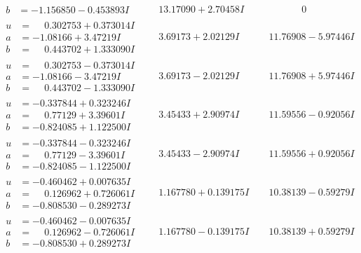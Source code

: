 \documentclass[1p]{elsarticle_modified}
\theoremstyle{definition}
\begin{document}
$$\begin{array}{c|c|c}
\begin{aligned}
b &= -1.156850 - 0.453893 I\end{aligned}
 & \phantom{-}13.17090 + 2.70458 I & \phantom{-0.000000 } 0 \\ \hline\begin{aligned}
u &= \phantom{-}0.302753 + 0.373014 I \\
a &= -1.08166 + 3.47219 I \\
b &= \phantom{-}0.443702 + 1.333090 I\end{aligned}
 & \phantom{-}3.69173 + 2.02129 I & \phantom{-}11.76908 - 5.97446 I \\ \hline\begin{aligned}
u &= \phantom{-}0.302753 - 0.373014 I \\
a &= -1.08166 - 3.47219 I \\
b &= \phantom{-}0.443702 - 1.333090 I\end{aligned}
 & \phantom{-}3.69173 - 2.02129 I & \phantom{-}11.76908 + 5.97446 I \\ \hline\begin{aligned}
u &= -0.337844 + 0.323246 I \\
a &= \phantom{-}0.77129 + 3.39601 I \\
b &= -0.824085 + 1.122500 I\end{aligned}
 & \phantom{-}3.45433 + 2.90974 I & \phantom{-}11.59556 - 0.92056 I \\ \hline\begin{aligned}
u &= -0.337844 - 0.323246 I \\
a &= \phantom{-}0.77129 - 3.39601 I \\
b &= -0.824085 - 1.122500 I\end{aligned}
 & \phantom{-}3.45433 - 2.90974 I & \phantom{-}11.59556 + 0.92056 I \\ \hline\begin{aligned}
u &= -0.460462 + 0.007635 I \\
a &= \phantom{-}0.126962 + 0.726061 I \\
b &= -0.808530 - 0.289273 I\end{aligned}
 & \phantom{-}1.167780 + 0.139175 I & \phantom{-}10.38139 - 0.59279 I \\ \hline\begin{aligned}
u &= -0.460462 - 0.007635 I \\
a &= \phantom{-}0.126962 - 0.726061 I \\
b &= -0.808530 + 0.289273 I\end{aligned}
 & \phantom{-}1.167780 - 0.139175 I & \phantom{-}10.38139 + 0.59279 I\\

\end{array}$$
\end{document}
